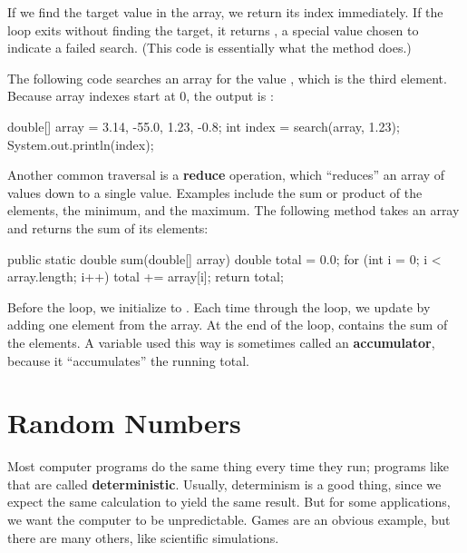 If we find the target value in the array, we return its index immediately.
If the loop exits without finding the target, it returns , a special value chosen to indicate a failed search.
(This code is essentially what the  method does.)

The following code searches an array for the value , which is the third element.
Because array indexes start at 0, the output is :

\begin{code}
double[] array = {3.14, -55.0, 1.23, -0.8};
int index = search(array, 1.23);
System.out.println(index);
\end{code}


Another common traversal is a {\bf reduce} operation, which ``reduces'' an array of values down to a single value.
Examples include the sum or product of the elements, the minimum, and the maximum.
The following method takes an array and returns the sum of its elements:

\begin{code}
public static double sum(double[] array) {
    double total = 0.0;
    for (int i = 0; i < array.length; i++) {
        total += array[i];
    }
    return total;
}
\end{code}


Before the loop, we initialize  to .
Each time through the loop, we update  by adding one element from the array.
At the end of the loop,  contains the sum of the elements.
A variable used this way is sometimes called an {\bf accumulator}, because it ``accumulates'' the running total.


\section{Random Numbers}
\label{random}


Most computer programs do the same thing every time they run; programs like that are called {\bf deterministic}.
Usually, determinism is a good thing, since we expect the same calculation to yield the same result.
But for some applications, we want the computer to be unpredictable.
Games are an obvious example, but there are many others, like scientific simulations.



